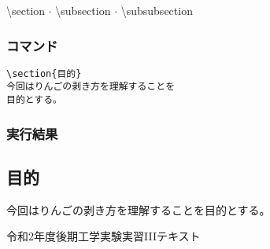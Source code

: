\documentclass[a4j, titlepage]{jarticle}
\begin{document}
\begin{itembox}[l]{\textbackslash section $\cdot$ \textbackslash subsection $\cdot$ \textbackslash subsubsection}

\begin{multicols}{2}

\subsubsection*{コマンド}

\begin{lstlisting}
\section{目的}
今回はりんごの剥き方を理解することを
目的とする。
\end{lstlisting}

\newpage
\subsubsection*{実行結果}
\setcounter{section}{0}
\begin{shadebox}
\section{目的}
今回はりんごの剥き方を理解することを目的とする。
\end{shadebox}



\end{multicols}

\end{itembox}



\begin{thebibliography}{9}
     令和2年度後期工学実験実習IIIテキスト
\end{thebibliography}
\end{document}
